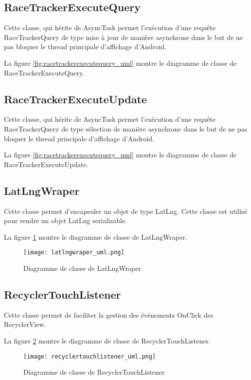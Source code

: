 \subsection{RaceTrackerExecuteQuery}

Cette classe, qui hérite de AsyncTask permet l'exécution d'une requête RaceTrackerQuery de type mise à jour de manière asynchrone dans le but de ne pas bloquer le thread principale d'affichage d'Android.

La figure \ref{fig:racetrackerexecutequery_uml} montre le diagramme de classe de RaceTrackerExecuteQuery.

\subsection{RaceTrackerExecuteUpdate}

Cette classe, qui hérite de AsyncTask permet l'exécution d'une requête RaceTrackerQuery de type sélection de manière asynchrone dans le but de ne pas bloquer le thread principale d'affichage d'Android.

La figure \ref{fig:racetrackerexecutequery_uml} montre le diagramme de classe de RaceTrackerExecuteUpdate.

\subsection{LatLngWraper}

Cette classe permet d'encapsuler un objet de type LatLng. Cette classe est utilisé pour rendre un objet LatLng serializable.

La figure \ref{fig:latlngwraper_uml} montre le diagramme de classe de LatLngWraper.

\begin{figure}[htb]
\centering 
\texttt{[image: latlngwraper\_uml.png]} 
\caption{Diagramme de classe de LatLngWraper}
\label{fig:latlngwraper_uml}
 \end{figure}

\subsection{RecyclerTouchListener}

Cette classe permet de faciliter la gestion des événements OnClick des RecyclerView.

La figure \ref{fig:recyclertouchlistener_uml} montre le diagramme de classe de RecyclerTouchListener.

\begin{figure}[htb]
\centering 
\texttt{[image: recyclertouchlistener\_uml.png]} 
\caption{Diagramme de classe de RecyclerTouchListener}
\label{fig:recyclertouchlistener_uml}
 \end{figure}

